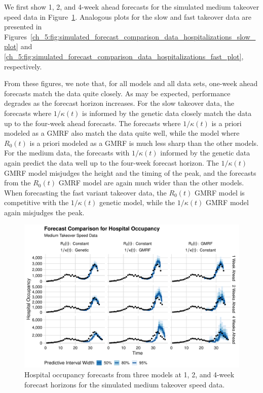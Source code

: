 We first show 1, 2, and 4-week ahead forecasts for the simulated medium takeover speed data in Figure~\ref{ch_5:fig:simulated_forecast_comparison_data_hospitalizations_medium_plot}.
Analogous plots for the slow and fast takeover data are presented in Figures~\ref{ch_5:fig:simulated_forecast_comparison_data_hospitalizations_slow_plot} and \ref{ch_5:fig:simulated_forecast_comparison_data_hospitalizations_fast_plot}, respectively.

From these figures, we note that, for all models and all data sets, one-week ahead forecasts match the data quite closely.
As may be expected, performance degrades as the forecast horizon increases.
For the slow takeover data, the forecasts where \( 1 / \kappa(t) \) is informed by the genetic data closely match the data up to the four-week ahead forecasts.
The forecasts where \( 1 / \kappa(t) \) is a priori modeled as a GMRF also match the data quite well, while the model where \( R_0(t) \) is a priori modeled as a GMRF is much less sharp than the other models.
For the medium data, the forecasts with \( 1 / \kappa(t) \) informed by the genetic data again predict the data well up to the four-week forecast horizon.
The \( 1 / \kappa(t) \) GMRF model misjudges the height and the timing of the peak, and the forecasts from the \( R_0(t) \) GMRF model are again much wider than the other models.
When forecasting the fast variant takeover data, the \( R_0(t) \) GMRF model is competitive with the \( 1 / \kappa(t) \) genetic model, while the \( 1 / \kappa(t) \) GMRF model again misjudges the peak.

\begin{figure}
    \centering
    \includegraphics[width=1.0\columnwidth]{simulated_forecast_comparison_data_hospitalizations_medium_plot}
    \caption[Hospital occupancy forecasts for simulated medium takeover speed data.]{Hospital occupancy forecasts from three models at 1, 2, and 4-week forecast horizons for the simulated medium takeover speed data.}
    \label{ch_5:fig:simulated_forecast_comparison_data_hospitalizations_medium_plot}
\end{figure}

